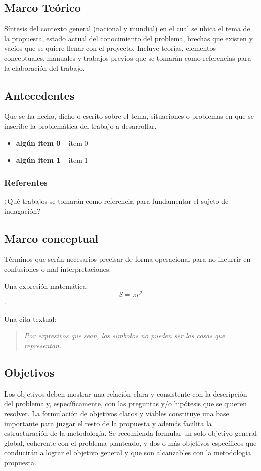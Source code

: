 \documentclass[a4paper, 11pt, oneside]{article}
\theoremstyle{definition}
\theoremstyle{remark}
\begin{document}
\begin{center}
 \section{Marco Teórico}
\end{center}
Síntesis del contexto general (nacional y mundial) en el cual se ubica el tema de la
propuesta, estado actual del conocimiento del problema, brechas que existen y vacíos que se quiere
llenar con el proyecto. Incluye teorías, elementos conceptuales, manuales y trabajos previos que se
tomarán como referencias para la elaboración del trabajo.
\subsection{Antecedentes}
Que se ha hecho, dicho o escrito sobre el tema, situaciones o problemas en que se inscribe la
problemática del trabajo a desarrollar.
\begin{itemize}
  \item\textbf{algún item 0} -- item 0
  \item\textbf{algún item 1} -- item 1
\end{itemize}
\subsubsection{Referentes}
¿Qué trabajos se tomarán como referencia para fundamentar el sujeto de indagación?
\subsection{Marco conceptual}
Términos que serán necesarios precisar de forma operacional para no incurrir en confusiones o mal
interpretaciones\cite{Fogel05}.

Una expresión matemática: \begin{equation}\label{eq:area} S = \pi r^2\end{equation}.

Una cita textual: 
\begin{quote}
\textit{Por expresivos que sean, los símbolos no pueden ser las cosas que
representan.}\cite{Huxley54}
\end{quote}


\clearpage

\begin{center}
\section{Objetivos}
\end{center}
Los objetivos deben mostrar una relación clara y consistente con la descripción del problema y,
específicamente, con las preguntas y/o hipótesis que se quieren resolver. La formulación de
objetivos claros y viables constituye una base importante para juzgar el resto de la propuesta y
además facilita la estructuración de la metodología. Se recomienda formular un solo objetivo general
global, coherente con el problema planteado, y dos o más objetivos específicos que conducirán a
lograr el objetivo general y que son alcanzables con la metodología propuesta.
\end{document}
